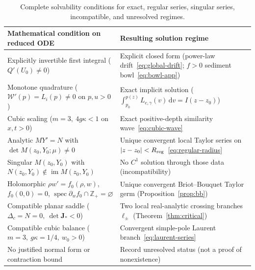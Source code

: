 \documentclass[12pt,a4paper,oneside]{report}
\numberwithin{equation}{chapter}
\theoremstyle{definition}
\theoremstyle{remark}\newtheorem{remark}[theorem]{Remark}
\newcommand{\dd}{\,\mathrm d}
\renewcommand{\arraystretch}{1.22}
\begin{document}
\begin{table}[!ht]\centering\small
\renewcommand{\arraystretch}{1.14}
\begin{tabularx}{\linewidth}{@{}p{.49\linewidth}X@{}}
\toprule
Mathematical condition on reduced ODE & Resulting solution regime\\\midrule
Explicitly invertible first integral ($Q'(U_0)\ne0$) & Explicit closed form (power-law drift~\eqref{eq:global-drift}; $f>0$ sediment bowl~\eqref{eq:bowl-app})\\
Monotone quadrature ($\mathcal W'(p)=L_i(p)\ne0$ on $p,u>0$) & Exact implicit solution ($\int_{p_0}^{p(z)}L_{c,\gamma}(v)\dd v=I(z-z_0)$)\\
Cubic scaling ($m=3,\ 4g\kappa<1$ on $x,t>0$) & Exact positive-depth similarity wave~\eqref{eq:cubic-wave}\\
Analytic $MY'=N$ with $\det M(z_0,Y_0;\mu)\ne0$ & Unique convergent local Taylor series on $|z-z_0|<R_{\rm reg}$~\eqref{eq:regular-radius}\\
Singular $M(z_0,Y_0)$ with $N(z_0,Y_0)\notin\operatorname{im}M(z_0,Y_0)$ & No $C^1$ solution through those data (incompatibility)\\
Holomorphic $\rho w'=f_0(\rho,w)$, $f_0(0,0)=0$, $\operatorname{spec}\partial_w f_0\cap\mathbb Z_+=\varnothing$ & Unique convergent Briot--Bouquet Taylor germ (Proposition~\ref{prop:bb})\\
Compatible planar saddle ($\Delta_c=N=0,\ \det\mathbf J_*<0$) & Two local real-analytic crossing branches $\ell_\pm$ (Theorem~\ref{thm:critical})\\
Compatible cubic balance ($m=3,\ g\kappa=1/4,\ w_0>0$) & Convergent simple-pole Laurent branch~\eqref{eq:laurent-series}\\
No justified normal form or contraction bound & Record unresolved status (not a proof of nonexistence)\\\bottomrule
\end{tabularx}
\caption[Analytical and series solvability conditions]{Complete solvability conditions for exact, regular series, singular series, incompatible, and unresolved regimes.}
\label{tab:solution-conditions}
\end{table}
\end{document}
